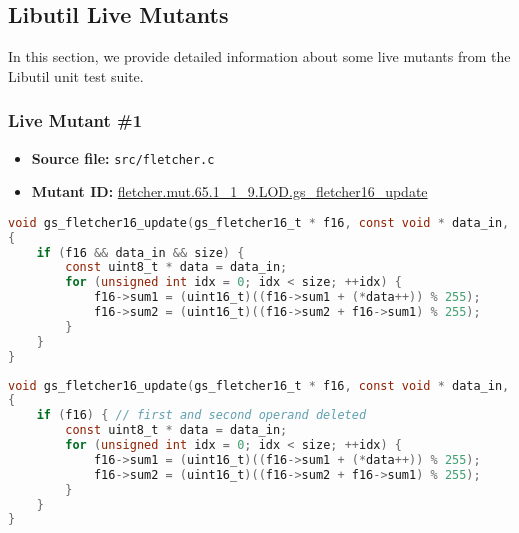


\subsection{Libutil Live Mutants}


In this section, we provide detailed information about some live mutants from the Libutil unit test suite.

\subsubsection{Live Mutant \#1}

\begin{itemize}
\item \textbf{Source file:} \texttt{src/fletcher.c}
\item \textbf{Mutant ID:} \url{fletcher.mut.65.1_1_9.LOD.gs_fletcher16_update}
\end{itemize}

\begin{lstlisting}[language=C, label=live_1, caption=Original source code.]
void gs_fletcher16_update(gs_fletcher16_t * f16, const void * data_in, size_t size)
{
    if (f16 && data_in && size) {
        const uint8_t * data = data_in;
        for (unsigned int idx = 0; idx < size; ++idx) {
            f16->sum1 = (uint16_t)((f16->sum1 + (*data++)) % 255);
            f16->sum2 = (uint16_t)((f16->sum2 + f16->sum1) % 255);
        }
    }
}
\end{lstlisting}

\begin{lstlisting}[language=C, label=live_1, caption=Mutant source code.]
void gs_fletcher16_update(gs_fletcher16_t * f16, const void * data_in, size_t size)
{
    if (f16) { // first and second operand deleted
        const uint8_t * data = data_in;
        for (unsigned int idx = 0; idx < size; ++idx) {
            f16->sum1 = (uint16_t)((f16->sum1 + (*data++)) % 255);
            f16->sum2 = (uint16_t)((f16->sum2 + f16->sum1) % 255);
        }
    }
}
\end{lstlisting}




